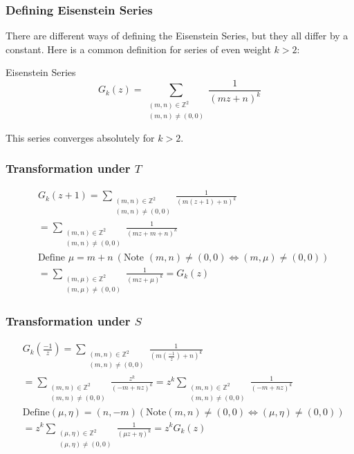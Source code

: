 \documentclass{beamer}
\begin{document}
\begin{frame}

\frametitle{Defining Eisenstein Series}
There are different ways of defining the Eisenstein Series, but they all differ by a constant. Here is a common definition for series of even weight $k>2$: 
\begin{block}{Eisenstein Series}
$$G_k(z) = \sum_{\substack{(m,n) \in \mathbb{Z}^2 \\ (m,n) \neq (0,0)}}  \frac{1}{(m z + n)^k}$$
\end{block}
This series converges absolutely for $k>2$.

\end{frame}

\begin{frame}
\frametitle{Transformation under $T$}

\begin{align*}
& G_k(z+ 1) = \sum_{\substack{(m,n) \in \mathbb{Z}^2 \\ (m,n) \neq (0,0)}}  \frac{1}{(m (z+1) + n)^k} \\
& = \sum_{\substack{(m,n) \in \mathbb{Z}^2 \\ (m,n) \neq (0,0)}}  \frac{1}{(m z+ m +  n)^k} \\
& \text{Define } \mu=m+n \ (\text{Note } (m,n) \neq (0,0) \iff (m, \mu) \neq (0,0)) \\
& =  \sum_{\substack{(m,\mu) \in \mathbb{Z}^2 \\ (m,\mu) \neq (0,0)}}  \frac{1}{(m z+ \mu)^k} = G_k(z)
\end{align*}


\end{frame}

\begin{frame}
\frametitle{Transformation under $S$}

\begin{align*}
&G_k \left( \frac{-1}{z} \right) = \sum_{\substack{(m,n) \in \mathbb{Z}^2 \\ (m,n) \neq (0,0)}}  \frac{1}{(m (\frac{-1}{z}) + n)^k} \\
&= \sum_{\substack{(m,n) \in \mathbb{Z}^2 \\ (m,n) \neq (0,0)}}  \frac{z^k}{(-m + n z)^k} = z^k \sum_{\substack{(m,n) \in \mathbb{Z}^2 \\ (m,n) \neq (0,0)}}  \frac{1}{(-m + n z)^k} \\
& \text{Define} (\mu, \eta) = (n, -m) (\text{Note} (m,n) \neq (0,0) \iff (\mu, \eta) \neq (0,0)) \\
& = z^k \sum_{\substack{(\mu, \eta) \in \mathbb{Z}^2 \\ (\mu, \eta) \neq (0,0)}}  \frac{1}{(\mu z + \eta)^k} = z^k G_k(z)
\end{align*}

\end{frame}
\end{document}
